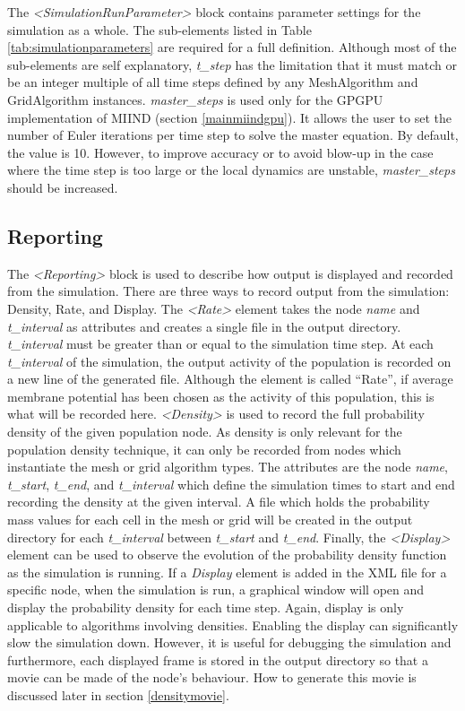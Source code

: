 \documentclass[utf8]{frontiersSCNS} %
\begin{document}
The \textit{\textless SimulationRunParameter\textgreater} block contains parameter settings for the simulation as a whole. The sub-elements listed in Table \ref{tab:simulationparameters} are required for a full definition. Although most of the sub-elements are self explanatory, \textit{t\_step} has the limitation that it must match or be an integer multiple of all time steps defined by any MeshAlgorithm and GridAlgorithm instances. \textit{master\_steps} is used only for the GPGPU implementation of MIIND (section \ref{mainmiindgpu}). It allows the user to set the number of Euler iterations per time step to solve the master equation. By default, the value is 10. However, to improve accuracy or to avoid blow-up in the case where the time step is too large or the local dynamics are unstable, \textit{master\_steps} should be increased. 

\subsection{Reporting}

The \textit{\textless Reporting\textgreater} block is used to describe how output is displayed and recorded from the simulation. There are three ways to record output from the simulation: Density, Rate, and Display. The \textit{\textless Rate\textgreater} element takes the node \textit{name} and \textit{t\_interval} as attributes and creates a single file in the output directory. \textit{t\_interval} must be greater than or equal to the simulation time step. At each \textit{t\_interval} of the simulation, the output activity of the population is recorded on a new line of the generated file. Although the element is called ``Rate'', if average membrane potential has been chosen as the activity of this population, this is what will be recorded here. \textit{\textless Density\textgreater} is used to record the full probability density of the given population node. As density is only relevant for the population density technique, it can only be recorded from nodes which instantiate the mesh or grid algorithm types. The attributes are the node \textit{name}, \textit{t\_start}, \textit{t\_end}, and \textit{t\_interval} which define the simulation times to start and end recording the density at the given interval. A file which holds the probability mass values for each cell in the mesh or grid will be created in the output directory for each \textit{t\_interval} between \textit{t\_start} and \textit{t\_end}. Finally, the \textit{\textless Display\textgreater} element can be used to observe the evolution of the probability density function as the simulation is running. If a \textit{Display} element is added in the XML file for a specific node, when the simulation is run, a graphical window will open and display the probability density for each time step. Again, display is only applicable to algorithms involving densities. Enabling the display can significantly slow the simulation down. However, it is useful for debugging the simulation and furthermore, each displayed frame is stored in the output directory so that a movie can be made of the node’s behaviour. How to generate this movie is discussed later in section \ref{densitymovie}.
\end{document}

